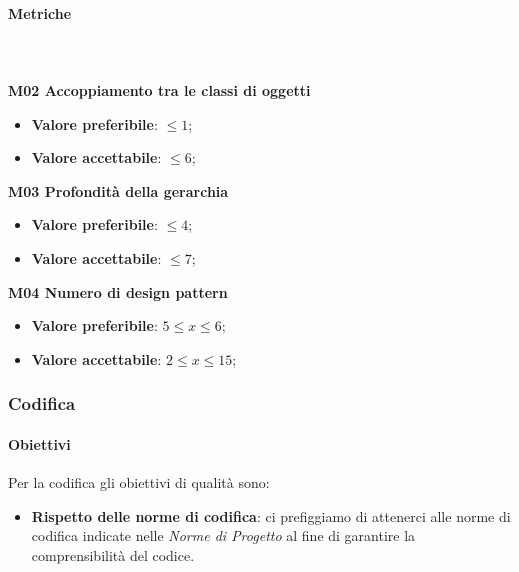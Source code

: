 			\paragraph{Metriche} \mbox{} \\ \\
				\textbf{M02 Accoppiamento tra le classi di oggetti} 
				\begin{itemize}
					\item \textbf{Valore preferibile}: $\le 1$;
					\item \textbf{Valore accettabile}: $\le 6$;
				\end{itemize}
				\textbf{M03 Profondità della gerarchia} 
				\begin{itemize}
					\item \textbf{Valore preferibile}: $\le 4$;
					\item \textbf{Valore accettabile}: $\le 7$;
				\end{itemize}			
				\textbf{M04 Numero di design pattern} 
				\begin{itemize}
					\item \textbf{Valore preferibile}: $5 \le x \le 6$; 
					\item \textbf{Valore accettabile}: $2 \le x \le 15$; 
				\end{itemize}
			
		\subsubsection{Codifica}
			\paragraph{Obiettivi}
			Per la codifica gli obiettivi di qualità sono:
			\begin{itemize}
				\item \textbf{Rispetto delle norme di codifica}: ci prefiggiamo di attenerci alle norme di codifica indicate nelle \textit{Norme di Progetto} al fine di garantire la comprensibilità del codice.
			\end{itemize}	 
